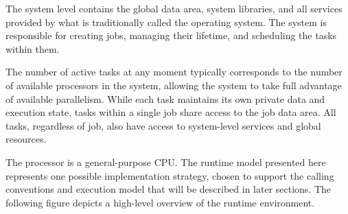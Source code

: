 The system level contains the global data area, system libraries, and all services provided by what is traditionally called the operating system. The system is responsible for creating jobs, managing their lifetime, and scheduling the tasks within them.

The number of active tasks at any moment typically corresponds to the number of available processors in the system, allowing the system to take full advantage of available parallelism. While each task maintains its own private data and execution state, tasks within a single job share access to the job data area. All tasks, regardless of job, also have access to system-level services and global resources.


The processor is a general-purpose CPU. The runtime model presented here represents one possible implementation strategy, chosen to support the calling conventions and execution model that will be described in later sections. The following figure depicts a high-level overview of the runtime environment.

